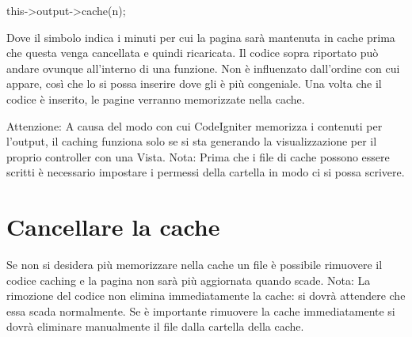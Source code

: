\begin{code}
this->output->cache(n);
\end{code}

Dove il simbolo  indica i minuti per cui la pagina sarà mantenuta in cache prima che questa venga cancellata e quindi ricaricata. Il codice sopra riportato può andare ovunque all'interno di una funzione. Non è influenzato dall'ordine con cui appare, così che lo si possa inserire dove gli è più congeniale. Una volta che il codice è inserito, le pagine verranno memorizzate nella cache.

Attenzione: A causa del modo con cui CodeIgniter memorizza i contenuti per l'output, il caching funziona solo se si sta generando la visualizzazione per il proprio controller con una Vista. 
Nota: Prima che i file di cache possono essere scritti è necessario impostare i permessi della cartella  in modo ci si possa scrivere.

\section{Cancellare la cache}
Se non si desidera più memorizzare nella cache un file è possibile rimuovere il codice caching e la pagina non sarà più aggiornata quando scade. 
Nota: La rimozione del codice non elimina immediatamente la cache: si dovrà attendere che essa scada normalmente. Se è importante rimuovere la cache immediatamente si dovrà eliminare manualmente il file dalla cartella della cache.